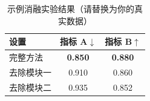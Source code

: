\begin{table}[htbp]
    \centering\small
    \caption{示例消融实验结果（请替换为你的真实数据）}
    \label{tab:ablation-example}
    \renewcommand{\arraystretch}{1.2}
    \setlength{\tabcolsep}{9pt}
    \begin{tabular}{lcc}
        \toprule
        \textbf{设置} & \textbf{指标 A}$\downarrow$ & \textbf{指标 B}$\uparrow$ \\
        \midrule
        完整方法       & \textbf{0.850} & \textbf{0.880} \\
        去除模块一     & 0.910 & 0.860 \\
        去除模块二     & 0.935 & 0.852 \\
        \bottomrule
    \end{tabular}
\end{table}
